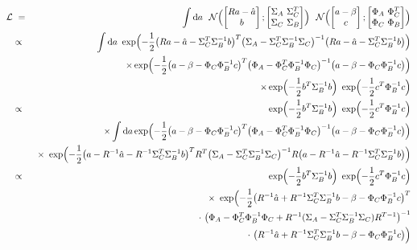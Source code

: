 \documentclass{article}
\renewcommand{\d}{{\mathrm{d}}}
\newcommand{\eqn}[1]{\begin{eqnarray}#1\end{eqnarray}}
\begin{document}
\eqn{
	 \mathcal{L} &\ =\ & \int \d a 
	\ \ \mathcal{N} \Bigl(  \begin{bmatrix}Ra - \hat{a}\\ b \end{bmatrix}; \begin{bmatrix}\Sigma_A\ \Sigma_{C}^T\\\Sigma_C \ \Sigma_B  \end{bmatrix} \Bigr) 
	 \ \ \mathcal{N} \Bigl(  \begin{bmatrix}a - \beta\\ c \end{bmatrix}; \begin{bmatrix}\Phi_A\ \Phi_{C}^T\\\Phi_C \ \Phi_B  \end{bmatrix} \Bigr) \\
	&\propto& \int \d a 
		\ \exp\Bigl(-\frac{1}{2}\bigl( Ra - \hat{a} - \Sigma_C^T\Sigma_B^{-1}b \bigr)^T\bigl( \Sigma_A-\Sigma_C^T\Sigma_B^{-1}\Sigma_C \bigr)^{-1}\bigl( Ra - \hat{a} - \Sigma_C^T\Sigma_B^{-1}b  \bigr)  \Bigr)
		 \\ && \quad\quad \times \exp\Bigl(-\frac{1}{2}\bigl( a-\beta-\Phi_C\Phi_B^{-1}c \bigr)^T\bigl( \Phi_A-\Phi_C^T\Phi_B^{-1}\Phi_C \bigr)^{-1}\bigl( a-\beta-\Phi_C\Phi_B^{-1}c \bigr)  \Bigr)\nonumber
		 \\ && \quad\quad \times  \exp\Bigl(-\frac{1}{2} b^T\Sigma_B^{-1}b \Bigr) \   \exp\Bigl(-\frac{1}{2} c^T\Phi_B^{-1}c \Bigr) \nonumber\\
	& \propto& \ \ \exp\Bigl(-\frac{1}{2} b^T\Sigma_B^{-1}b \Bigr) \   \exp\Bigl(-\frac{1}{2} c^T\Phi_B^{-1}c \Bigr)  \\
	 &&   \times   \int \d a \exp\Bigl(-\frac{1}{2}\bigl( a-\beta-\Phi_C\Phi_B^{-1}c \bigr)^T\bigl( \Phi_A-\Phi_C^T\Phi_B^{-1}\Phi_C \bigr)^{-1}\bigl( a-\beta-\Phi_C\Phi_B^{-1}c \bigr)  \Bigr)\nonumber
		 \\ &&  \times  \ \exp\Bigl(-\frac{1}{2}\bigl( a - R^{-1}\hat{a} - R^{-1}\Sigma_C^T\Sigma_B^{-1}b \bigr)^TR^T\bigl( \Sigma_A-\Sigma_C^T\Sigma_B^{-1}\Sigma_C \bigr)^{-1} R\bigl( a - R^{-1}\hat{a} - R^{-1}\Sigma_C^T\Sigma_B^{-1}b  \bigr)  \Bigr)\nonumber\\
	 & \propto& \ \ \exp\Bigl(-\frac{1}{2} b^T\Sigma_B^{-1}b \Bigr) \   \exp\Bigl(-\frac{1}{2} c^T\Phi_B^{-1}c \Bigr)  \\
	 &&   \times \  \exp\Bigl(-\frac{1}{2}\bigl( R^{-1}\hat{a} + R^{-1}\Sigma_C^T\Sigma_B^{-1}b -\beta-\Phi_C\Phi_B^{-1}c \bigr)^T \nonumber\\
	&& \hspace*{4cm} \cdot \ \bigl( \Phi_A-\Phi_C^T\Phi_B^{-1}\Phi_C  + R^{-1} ( \Sigma_A - \Sigma_C^T\Sigma_B^{-1}\Sigma_C )R^{T-1}\bigr)^{-1}    \nonumber\\
	&& \hspace*{8cm} \cdot \	\bigl( R^{-1}\hat{a} + R^{-1}\Sigma_C^T\Sigma_B^{-1}b -\beta-\Phi_C\Phi_B^{-1}c \bigr)  \Bigr)\nonumber
}
\end{document}
